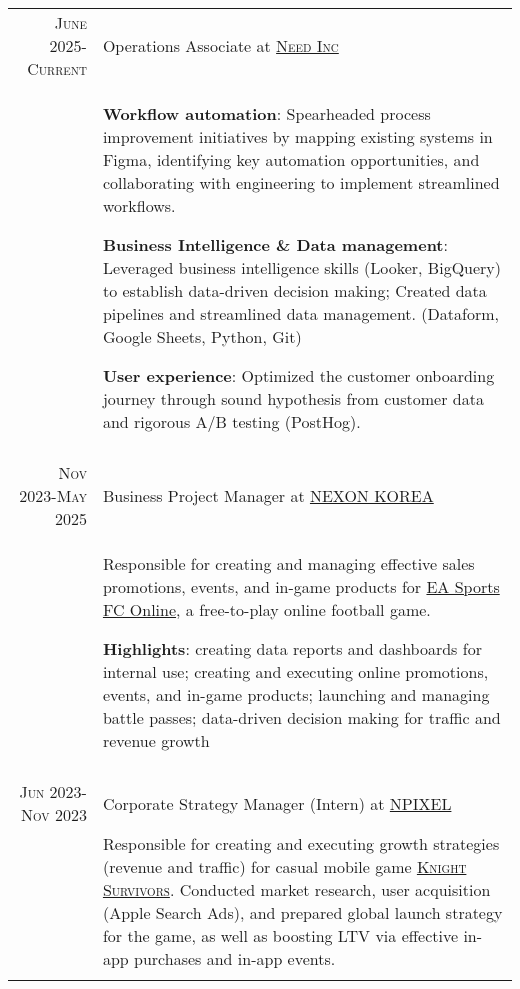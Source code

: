 \documentclass[a4paper,10pt]{article} %
\begin{document}
\begin{tabular}{r|p{11cm}}

    \textsc{June 2025-Current} & Operations Associate at
    \href{https://www.need.ai}{\textsc{Need Inc}} \emph{}\\
& \footnotesize{
    \textbf{Workflow automation}: Spearheaded process improvement initiatives by mapping existing systems in Figma,
    identifying key automation opportunities, and collaborating with engineering to implement streamlined workflows.

    \vspace{2mm}

    \textbf{Business Intelligence \& Data management}: Leveraged business intelligence skills
    (Looker, BigQuery) to establish data-driven decision making; Created data pipelines
    and streamlined data management. (Dataform, Google Sheets, Python, Git)

    \vspace{2mm}
    \textbf{User experience}: Optimized the customer onboarding journey through sound hypothesis from customer
    data and rigorous A/B testing (PostHog).
    }\\

\multicolumn{2}{c}{} \\
    
    \textsc{Nov 2023-May 2025} & Business Project Manager at
    \href{https://www.nexon.com}{\textsc{NEXON KOREA}} \emph{}\\
& \footnotesize{Responsible for creating and managing effective sales promotions, events, and in-game
    products for
    \href{https://fconline.nexon.com}{EA Sports FC Online}, a free-to-play
    online football game.

    \vspace{2mm}
    
    \textbf{Highlights}: creating data reports and dashboards for internal use;
    creating and executing online promotions, events, and in-game products;
    launching and managing battle passes; data-driven decision making for
traffic and revenue growth}\\
\multicolumn{2}{c}{} \\

    \textsc{Jun 2023-Nov 2023} & Corporate Strategy Manager (Intern) at
    \href{https://www.npixel.co.kr}{\textsc{NPIXEL}} \emph{}\\
& \footnotesize{Responsible for creating and executing 
    growth strategies (revenue and traffic) for casual mobile game \href{https://play.google.com/store/apps/details?id=com.npixel.knightsurvivors}{\textsc{Knight Survivors}}.
Conducted market research, user acquisition (Apple Search Ads), and prepared
global launch strategy for the game, as well as boosting LTV via effective in-app
purchases and in-app events.}\\
\multicolumn{2}{c}{} \\


\end{tabular}
\end{document}
